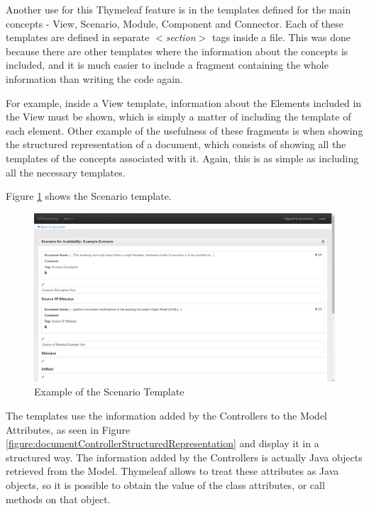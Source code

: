 \documentclass{llncs}
\begin{document}
Another use for this Thymeleaf feature is in the templates defined for the main concepts - View, Scenario, Module, Component and Connector. Each of these templates are defined in separate \textit{$<$section$>$} tags inside a file. This was done because there are other templates where the information about the concepts is included, and it is much easier to include a fragment containing the whole information than writing the code again. 

For example, inside a View template, information about the Elements included in the View must be shown, which is simply a matter of including the template of each element. Other example of the usefulness of these fragments is when showing the structured representation of a document, which consists of showing all the templates of the concepts associated with it. Again, this is as simple as including all the necessary templates.

Figure \ref{figure:viewScenarioTemplate} shows the Scenario template.
\begin{figure}
\centering
\includegraphics[scale=0.3]{images/scenarioExample}
\caption{Example of the Scenario Template}
\label{figure:viewScenarioTemplate}
\end{figure}
The templates use the information added by the Controllers to the Model Attributes, as seen in Figure \ref{figure:documentControllerStructuredRepresentation} and display it in a structured way. The information added by the Controllers is actually Java objects retrieved from the Model. Thymeleaf allows to treat these attributes as Java objects, so it is possible to obtain the value of the class attributes, or call methods on that object. 
\end{document}
